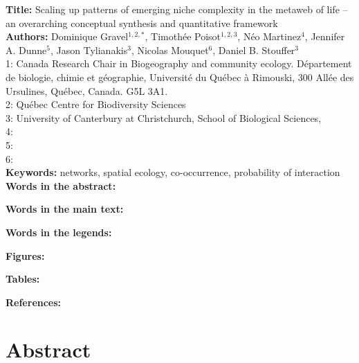 \documentclass[12pt]{article}
\begin{document}
\linenumbers 
\modulolinenumbers[1]

\textbf{Title:} Scaling up patterns of emerging niche complexity in the metaweb of life -- an overarching conceptual synthesis and quantitative framework\\

\textbf{Authors:} Dominique Gravel$^{1,2,*}$, Timoth\'ee Poisot$^{1,2,3}$, N\'eo
Martinez$^{4}$, Jennifer A. Dunne$^{5}$, Jason Tylianakis$^{3}$, Nicolas
Mouquet$^{6}$, Daniel B. Stouffer$^{3}$ \\

1: Canada Research Chair in Biogeography and community ecology. D\'epartement de
biologie, chimie et g\'eographie, Universit\'e du Qu\'ebec \`a Rimouski, 300
All\'ee des Ursulines, Qu\'ebec, Canada. G5L 3A1.\\

2: Qu\'ebec Centre for Biodiversity Sciences\\

3: University of Canterbury at Christchurch, School of Biological Sciences,\\

4: \\

5: \\

6:\\

\textbf{Keywords:} networks, spatial ecology, co-occurrence, probability of interaction\\

\textbf{Words in the abstract:} 

\textbf{Words in the main text:} 

\textbf{Words in the legends:}  

\textbf{Figures:} 

\textbf{Tables:}     

\textbf{References:} 

\newpage
\doublespacing

\section*{Abstract} 

\newpage
\end{document}
